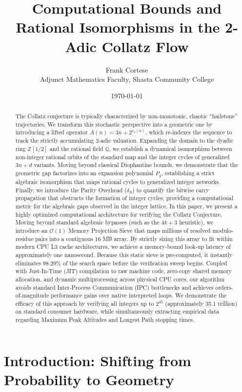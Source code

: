 \documentclass[11pt, a4paper]{article}
\title{Computational Bounds and Rational Isomorphisms in the 2-Adic Collatz Flow}
\author{Frank Cortese \\ \small{Adjunct Mathematics Faculty, Shasta Community College}}
\date{\today}
\theoremstyle{definition}
\begin{document}
\maketitle

\begin{abstract}
The Collatz conjecture is typically characterized by non-monotonic, chaotic ``hailstone'' trajectories. We transform this stochastic perspective into a geometric one by introducing a lifted operator $A(n)=3n+2^{v_2(n)}$, which re-indexes the sequence to track the strictly accumulating 2-adic valuation. Expanding the domain to the dyadic ring $\mathbb{Z}[1/2]$ and the rational field $\mathbb{Q}$, we establish a dynamical isomorphism between non-integer rational orbits of the standard map and the integer cycles of generalized $3n+d$ variants. Moving beyond classical Diophantine bounds, we demonstrate that the geometric gap factorizes into an expansion polynomial $P_g$, establishing a strict algebraic isomorphism that maps rational cycles to generalized integer networks. Finally, we introduce the Parity Overhead ($\delta_S$) to quantify the bitwise carry propagation that obstructs the formation of integer cycles, providing a computational metric for the algebraic gaps observed in the integer lattice. In this paper, we present a highly optimized computational architecture for verifying the Collatz Conjecture. Moving beyond standard algebraic bypasses (such as the $4k+3$ heuristic), we introduce an $\mathcal{O}(1)$ Memory Projection Sieve that maps millions of resolved modulo-residue pairs into a contiguous 16 MB array. By strictly sizing this array to fit within modern CPU L3 cache architectures, we achieve a memory-bound look-up latency of approximately one nanosecond. Because this static sieve is pre-computed, it instantly eliminates 98.29\% of the search space before the verification sweep begins. Coupled with Just-In-Time (JIT) compilation to raw machine code, zero-copy shared memory allocation, and dynamic multiprocessing across physical CPU cores, our algorithm avoids standard Inter-Process Communication (IPC) bottlenecks and achieves orders-of-magnitude performance gains over native interpreted loops. We demonstrate the efficacy of this approach by verifying all integers up to $2^{45}$ (approximately 35.1 trillion) on standard consumer hardware, while simultaneously extracting empirical data regarding Maximum Peak Altitudes and Longest Path stopping times.
\end{abstract}

\section{Introduction: Shifting from Probability to Geometry}
\end{document}
